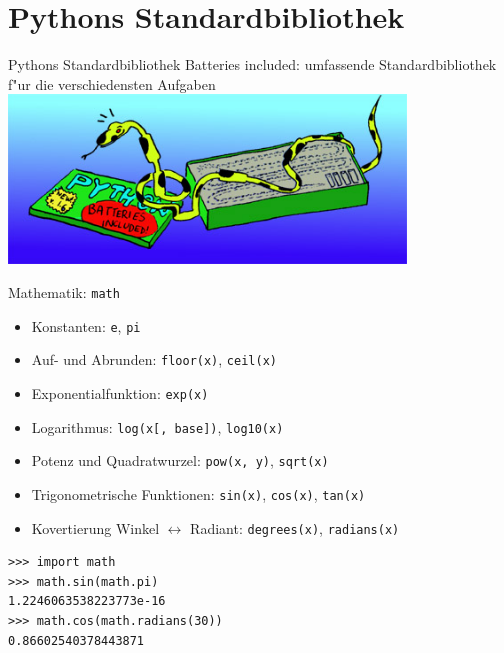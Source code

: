 \section{Pythons Standardbibliothek}

\begin{frame}{Pythons Standardbibliothek}
\alert{\glqq Batteries included\grqq}: umfassende Standardbibliothek f"ur die verschiedensten Aufgaben\\[4mm]

\includegraphics[height=4.5cm]{images/batteries_included.jpg}
\end{frame}

\begin{frame}[fragile]{Mathematik: \texttt{math}}
\begin{itemize}
\item Konstanten: \texttt{e}, \texttt{pi}
\item Auf- und Abrunden: \texttt{floor(x)}, \texttt{ceil(x)}
\item Exponentialfunktion: \texttt{exp(x)}
\item Logarithmus: \texttt{log(x[, base])}, \texttt{log10(x)}
\item Potenz und Quadratwurzel: \texttt{pow(x, y)}, \texttt{sqrt(x)}
\item Trigonometrische Funktionen: \texttt{sin(x)}, \texttt{cos(x)}, \texttt{tan(x)}
\item Kovertierung Winkel $\leftrightarrow$ Radiant: \texttt{degrees(x)}, \texttt{radians(x)}
\end{itemize}
\begin{lstlisting}[style=Shell]
>>> import math
>>> math.sin(math.pi)
1.2246063538223773e-16
>>> math.cos(math.radians(30))
0.86602540378443871
\end{lstlisting}
\end{frame}

